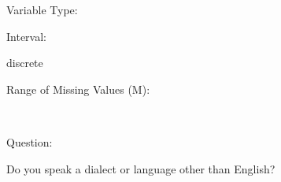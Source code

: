 \documentclass[
]{article}
\begin{document}
\begin{minipage}[t]{0.3\linewidth}

Variable Type:

\end{minipage}%
\begin{minipage}[t]{0.7\linewidth}

\end{minipage}

\begin{minipage}[t]{0.3\linewidth}

Interval:

\end{minipage}%
\begin{minipage}[t]{0.7\linewidth}

discrete

\end{minipage}

\begin{minipage}[t]{0.3\linewidth}

Range of Missing Values (M):

\end{minipage}%
\begin{minipage}[t]{0.7\linewidth}

~

\end{minipage}

\begin{minipage}[t]{0.3\linewidth}

Question:

\end{minipage}%
\begin{minipage}[t]{0.7\linewidth}

Do you speak a dialect or language other than English?

\end{minipage}
\end{document}
